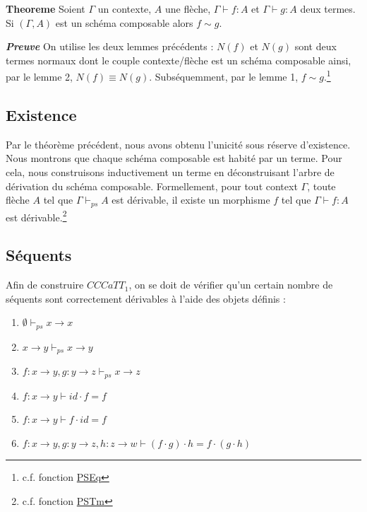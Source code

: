 \documentclass[conference]{IEEEtran}
\begin{document}
	\textbf{Theoreme} Soient $\Gamma$ un contexte, $A$ une flèche, $\Gamma \vdash f : A$ et $\Gamma \vdash g : A$ deux termes. Si $(\Gamma, A)$ est un schéma composable alors $f \sim g$.
	
	\textbf{\textit{Preuve}} On utilise les deux lemmes précédents : $N(f)$ et $N(g)$ sont deux termes normaux dont le couple contexte/flèche est un schéma composable ainsi, par le lemme 2, $N(f) \equiv N(g)$. Subséquemment, par le lemme 1, $f \sim g$.\footnote{c.f. fonction \href{https://github.com/ehouget/L3-ENS-Internship/blob/main/pasting-scheme-for-categories/PSEq.agda}{\textup{PSEq}}} \\
	
	\subsection{Existence}
	Par le théorème précédent, nous avons obtenu l'unicité sous réserve d'existence. Nous montrons que chaque schéma composable est habité par un terme. Pour cela, nous construisons inductivement un terme en déconstruisant l'arbre de dérivation du schéma composable. Formellement, pour tout context $\Gamma$, toute flèche $A$ tel que $\Gamma \vdash_{ps} A$ est dérivable, il existe un morphisme $f$ tel que $\Gamma \vdash f : A$ est dérivable.\footnote{c.f. fonction \href{https://github.com/ehouget/L3-ENS-Internship/blob/main/pasting-scheme-for-categories/PSTm.agda}{PSTm}}
	
	\subsection{Séquents}
	Afin de construire $CCCaTT_1$, on se doit de vérifier qu'un certain nombre de séquents sont correctement dérivables à l'aide des objets définis :
	
	\begin{enumerate}
		\item $\emptyset \vdash_{ps} x \rightarrow x$
		\item $x \rightarrow y \vdash_{ps} x \rightarrow y$
		\item $f : x \rightarrow y, g : y \rightarrow z \vdash_{ps} x \rightarrow z$
		\item $f : x \rightarrow y \vdash id \cdot f = f$
		\item $f : x \rightarrow y \vdash f \cdot id = f$
		\item $f : x \rightarrow y, g : y \rightarrow z, h : z \rightarrow w \vdash (f \cdot g) \cdot h = f \cdot (g \cdot h)$
	\end{enumerate}
	
\end{document}
